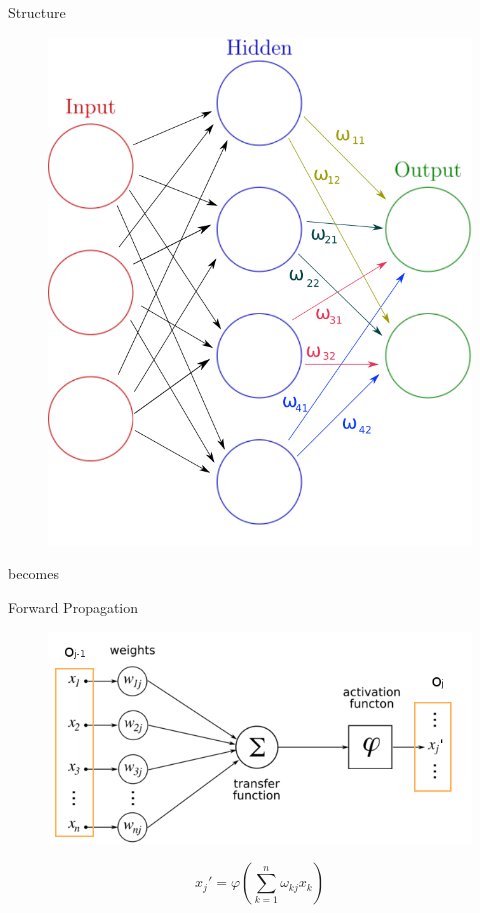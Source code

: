 \documentclass[10pt]{beamer}
\begin{document}
\begin{frame}[fragile]{Structure}
	\begin{figure}
  \includegraphics[scale=0.4]{str2A}
	\centering
	\end{figure}
  \begin{center}becomes\end{center}
\end{frame}

\begin{frame}{Forward Propagation}
	\begin{figure}
  \includegraphics[scale=0.4]{forwardP3}
	\centering
	\end{figure}

	\[x_j' = \varphi \left(\sum_{k=1}^n \omega_{kj} x_k \right)\]
\end{frame}
\end{document}
